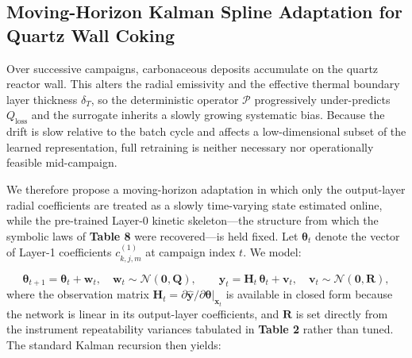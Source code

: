\documentclass[10pt,journal,onecolumn]{IEEEtran}
\begin{document}
\subsection{Moving-Horizon Kalman Spline Adaptation for Quartz Wall Coking}
Over successive campaigns, carbonaceous deposits accumulate on the quartz reactor wall. This alters the radial emissivity and the effective thermal boundary layer thickness $\delta_T$, so the deterministic operator $\mathcal{P}$ progressively under-predicts $Q_{\text{loss}}$ and the surrogate inherits a slowly growing systematic bias. Because the drift is slow relative to the batch cycle and affects a low-dimensional subset of the learned representation, full retraining is neither necessary nor operationally feasible mid-campaign.

We therefore propose a moving-horizon adaptation in which only the output-layer radial coefficients are treated as a slowly time-varying state estimated online, while the pre-trained Layer-0 kinetic skeleton—the structure from which the symbolic laws of \textbf{Table 8} were recovered—is held fixed. Let $\boldsymbol{\theta}_t$ denote the vector of Layer-1 coefficients $c_{k,j,m}^{(1)}$ at campaign index $t$. We model:

\begin{equation}
\boldsymbol{\theta}_{t+1} = \boldsymbol{\theta}_t + \mathbf{w}_t, \quad \mathbf{w}_t \sim \mathcal{N}(\mathbf{0}, \mathbf{Q}), \qquad \mathbf{y}_t = \mathbf{H}_t\,\boldsymbol{\theta}_t + \mathbf{v}_t, \quad \mathbf{v}_t \sim \mathcal{N}(\mathbf{0}, \mathbf{R}),
\end{equation}
where the observation matrix $\mathbf{H}_t = \partial \hat{\mathbf{y}} / \partial \boldsymbol{\theta}|_{\mathbf{x}_t}$ is available in closed form because the network is linear in its output-layer coefficients, and $\mathbf{R}$ is set directly from the instrument repeatability variances tabulated in \textbf{Table 2} rather than tuned. The standard Kalman recursion then yields:
\end{document}
